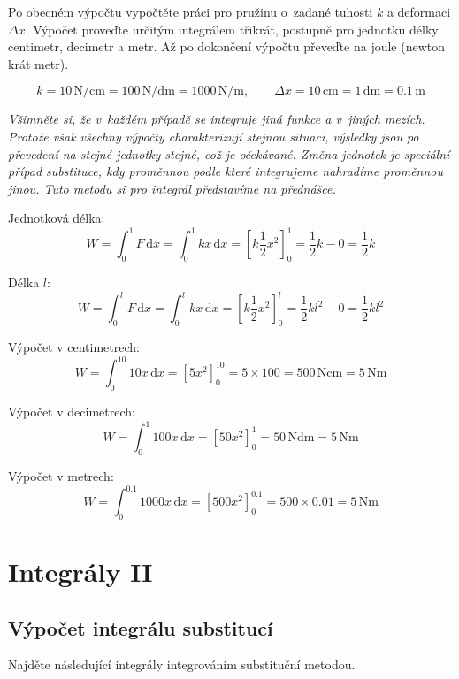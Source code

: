 Po obecném výpočtu vypočtěte práci pro pružinu o zadané tuhosti $k$ a
deformaci $\Delta x$. Výpočet proveďte určitým integrálem třikrát,
postupně pro jednotku délky centimetr, decimetr a metr. Až po
dokončení výpočtu převeďte na joule (newton krát metr).

$$k=10 \,\mathrm{N}/\mathrm{cm}=100 \,\mathrm{N}/\mathrm{dm}=1000 \,\mathrm{N}/\mathrm{m}, \qquad \Delta x=10\,\mathrm{cm}=1\,\mathrm{dm}=0.1\,\mathrm{m}$$

\textit{Všimněte si, že v každém případě se integruje jiná funkce a v jiných
mezích. Protože však všechny výpočty charakterizují stejnou situaci,
výsledky jsou po převedení na stejné jednotky stejné, což je
očekávané. 
Změna jednotek je speciální případ substituce, kdy proměnnou podle
které integrujeme nahradíme proměnnou jinou. Tuto metodu si pro
integrál představíme na přednášce.
}

\reseni

Jednotková délka:
$$W=\int_0^1 F\,\mathrm dx = \int_0^1 kx\,\mathrm dx = \left[k\frac 12 x^2\right]_0^1=\frac 12 k-0=\frac 12 k$$

Délka $l$:
$$W=\int_0^l F\,\mathrm dx = \int_0^l kx\,\mathrm dx = \left[k\frac 12 x^2\right]_0^l=\frac 12 kl^2-0=\frac 12 kl^2$$

Výpočet v centimetrech:
$$W=\int_0^{10}  10 x\,\mathrm dx = \left[5 x^2\right]_0^{10}=5\times 100=500\,\mathrm N \mathrm{cm}=5\,\mathrm N\mathrm m$$


Výpočet v decimetrech:
$$W=\int_0^{1}  100 x\,\mathrm dx = \left[50 x^2\right]_0^{1}=50\,\mathrm N \mathrm{dm}=5\,\mathrm N\mathrm m$$

Výpočet v metrech:
$$W=\int_0^{0.1}  1000 x\,\mathrm dx = \left[500 x^2\right]_0^{0.1}=500\times 0.01=5\,\mathrm N \mathrm{m}$$


\konec





\stranka
\section{Integrály II}



\stranka
\subsection{Výpočet integrálu substitucí} Najděte následující integrály integrováním substituční metodou.

